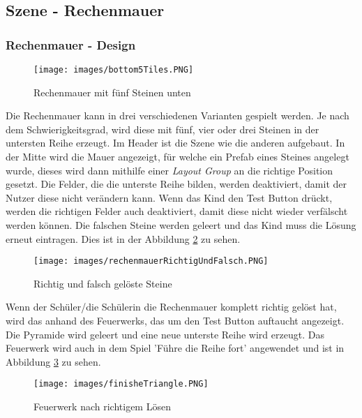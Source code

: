 \subsection{Szene - Rechenmauer}
\subsubsection{Rechenmauer - Design}
\begin{figure}[htbp]
  \centering
  \texttt{[image: images/bottom5Tiles.PNG]}
  \caption{Rechenmauer mit fünf Steinen unten}
  \label{triangle}
\end{figure}
Die Rechenmauer kann in drei verschiedenen Varianten gespielt werden. Je nach dem Schwierigkeitsgrad, wird diese mit fünf, vier oder drei Steinen in der untersten Reihe erzeugt. Im Header ist die Szene wie die anderen aufgebaut. In der Mitte wird die Mauer angezeigt, für welche ein Prefab eines Steines angelegt wurde, dieses wird dann mithilfe einer \textit{Layout Group} an die richtige Position gesetzt. Die Felder, die die unterste Reihe bilden, werden deaktiviert, damit der Nutzer diese nicht verändern kann. Wenn das Kind den Test Button drückt, werden die richtigen Felder auch deaktiviert, damit diese nicht wieder verfälscht werden können. Die falschen Steine werden geleert und das Kind muss die Lösung erneut eintragen. Dies ist in der Abbildung \ref{wrongAndRightStone} zu sehen.\\
\begin{figure}[htbp]
  \centering
  \texttt{[image: images/rechenmauerRichtigUndFalsch.PNG]}
  \caption{Richtig und falsch gelöste Steine}
  \label{wrongAndRightStone}
\end{figure}
Wenn der Schüler/die Schülerin die Rechenmauer komplett richtig gelöst hat, wird das anhand des Feuerwerks, das um den Test Button auftaucht angezeigt. Die Pyramide wird geleert und eine neue unterste Reihe wird erzeugt. Das Feuerwerk wird auch in dem Spiel 'Führe die Reihe fort' angewendet und ist in Abbildung \ref{firework} zu sehen.
\begin{figure}[htbp]
  \centering
  \texttt{[image: images/finisheTriangle.PNG]}
  \caption{Feuerwerk nach richtigem Lösen}
  \label{firework}
\end{figure}
